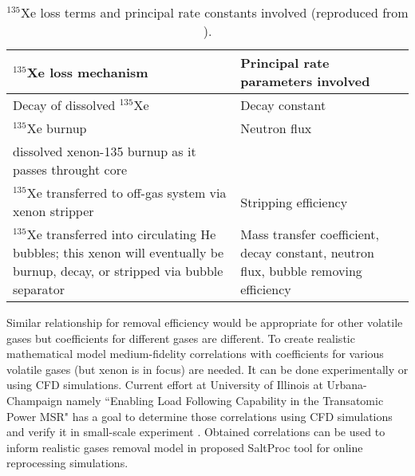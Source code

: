 \begin{table}[ht!]
\caption{$^{135}$Xe loss terms and principal rate constants involved
 (reproduced from \cite{kedl_development_1967}).}
  \centering
\begin{tabularx}{\textwidth}{b | b}
\hline \textbf{$^{135}$Xe loss mechanism}      & \textbf{Principal rate 
parameters involved}  	\\
\hline Decay of dissolved $^{135}$Xe  & Decay constant							\\
\hline $^{135}$Xe burnup              &  Neutron flux		 					\\
dissolved xenon-135 burnup as it passes throught core  & 			            \\		\hline $^{135}$Xe transferred to off-gas system via xenon stripper & Stripping efficiency		\\
\hline $^{135}$Xe transferred into circulating He bubbles; this xenon will eventually be burnup, decay, or stripped via bubble separator & Mass transfer coefficient, decay constant, neutron flux, bubble removing efficiency		\\
\hline 
\end{tabularx}
  		\label{tab:xe_loss}
\end{table}

Similar relationship for removal efficiency would be appropriate 
for other volatile gases but coefficients for different gases are 
different. To create realistic mathematical model medium-fidelity correlations with 
coefficients for various volatile gases (but xenon is in focus) are needed. It can be 
done experimentally or using CFD simulations. Current effort at University of 
 Illinois at Urbana-Champaign namely ``Enabling Load Following Capability in the 
Transatomic Power MSR" has a goal to determine those correlations using CFD simulations 
and verify it in small-scale experiment \cite{huff_enabling_2018}. Obtained correlations 
can be used to inform realistic gases removal model in proposed SaltProc tool for 
online reprocessing simulations.


